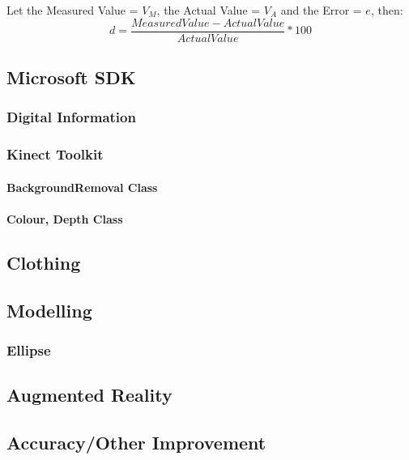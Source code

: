 Let the Measured Value = $V_M$, the Actual Value = $V_A$ and the Error = $e$, then:\\
\begin{equation} \label{eq: measurementAcc}
d = \frac{Measured Value - Actual Value}{Actual Value} * 100
\end{equation} 


\subsection{Microsoft SDK}

\subsubsection{Digital Information}

\subsubsection{Kinect Toolkit}

\paragraph{BackgroundRemoval Class}

\paragraph{Colour, Depth Class}


\subsection{Clothing}



\subsection{Modelling}

\subsubsection{Ellipse}




\subsection{Augmented Reality}


\subsection{Accuracy/Other Improvement }